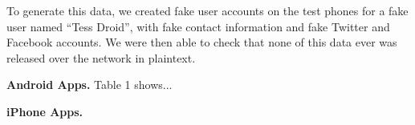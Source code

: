   To generate this data, we created fake user accounts on the test phones for a fake user named ``Tess Droid'', with fake contact information and fake Twitter and Facebook accounts. We were then able to check that none of this data ever was released over the network in plaintext.

  {\bf Android Apps.}
  Table 1 shows...

  {\bf iPhone Apps.}






